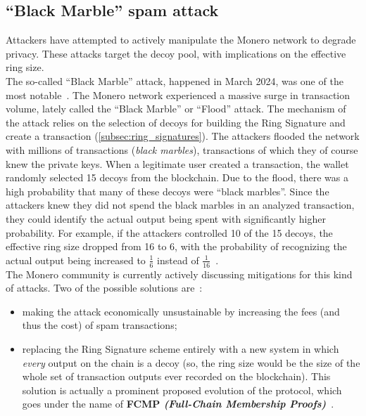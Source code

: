 \documentclass[conference]{IEEEtran}
\begin{document}
\subsection{``Black Marble'' spam attack}
Attackers have attempted to actively manipulate the Monero network to degrade privacy. These attacks target the decoy pool, with implications on the effective ring size.\\
The so-called ``Black Marble'' attack, happened in March 2024, was one of the most notable~\cite{black_marble_attack}. The Monero network experienced a massive surge in transaction volume, lately called the ``Black Marble'' or ``Flood'' attack. The mechanism of the attack relies on the selection of decoys for building the Ring Signature and create a transaction (\autoref{subsec:ring_signatures}). The attackers flooded the network with millions of transactions (\textit{black marbles}), transactions of which they of course knew the private keys. When a legitimate user created a transaction, the wallet randomly selected 15 decoys from the blockchain. Due to the flood, there was a high probability that many of these decoys were ``black marbles''. Since the attackers knew they did not spend the black marbles in an analyzed transaction, they could identify the actual output being spent with significantly higher probability. For example, if the attackers controlled 10 of the 15 decoys, the effective ring size dropped from 16 to 6, with the probability of recognizing the actual output being increased to $\frac{1}{6}$ instead of $\frac{1}{16}$~\cite{black_marble_analysis}.\\
The Monero community is currently actively discussing mitigations for this kind of attacks. Two of the possible solutions are~\cite{black_marble_solutions}:
\begin{itemize}
\item making the attack economically unsustainable by increasing the fees (and thus the cost) of spam transactions;
\item replacing the Ring Signature scheme entirely with a new system in which \textit{every} output on the chain is a decoy (so, the ring size would be the size of the whole set of transaction outputs ever recorded on the blockchain). This solution is actually a prominent proposed evolution of the protocol, which goes under the name of \textbf{FCMP \textit{(Full-Chain Membership Proofs)}}~\cite{fcmp}.
\end{itemize}
\end{document}
